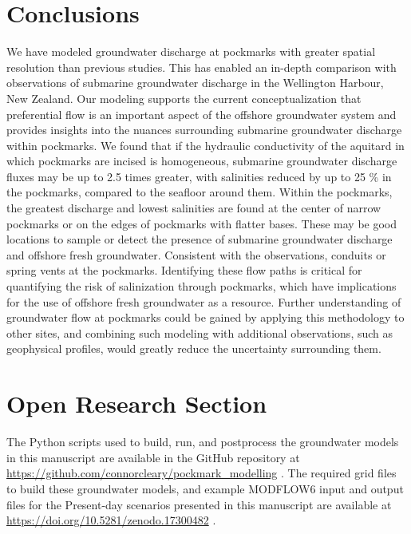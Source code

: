 \documentclass[draft, 10pt]{agujournal2019}
\begin{document}
\section{Conclusions}
We have modeled groundwater discharge at pockmarks with greater spatial resolution than previous studies.
This has enabled an in-depth comparison with observations of submarine groundwater discharge in the Wellington Harbour, New Zealand.
Our modeling supports the current conceptualization that preferential flow is an important aspect of the offshore groundwater system and provides insights into the nuances surrounding submarine groundwater discharge within pockmarks.
We found that if the hydraulic conductivity of the aquitard in which pockmarks are incised is homogeneous, submarine groundwater discharge fluxes may be up to 2.5 times greater,
with salinities reduced by up to 25 \% in the pockmarks,
compared to the seafloor around them.
Within the pockmarks, the greatest discharge and lowest salinities are found at the center of narrow pockmarks or on the edges of pockmarks with flatter bases.
These may be good locations to sample or detect the presence of submarine groundwater discharge and offshore fresh groundwater.
Consistent with the observations, conduits or spring vents at the pockmarks.
Identifying these flow paths is critical for quantifying the risk of salinization through pockmarks, which have implications for the use of offshore fresh groundwater as a resource.
Further understanding of groundwater flow at pockmarks could be gained by applying this methodology to other sites, and combining such modeling with additional observations, such as geophysical profiles, would greatly reduce the uncertainty surrounding them.

\section*{Open Research Section}
The Python scripts used to build, run, and postprocess the groundwater models in this manuscript are available in the GitHub repository at \url{https://github.com/connorcleary/pockmark_modelling} \cite{cleary_python_2025}. The required grid files to build these groundwater models, and example MODFLOW6 input and output files for the Present-day scenarios presented in this manuscript are available at \url{https://doi.org/10.5281/zenodo.17300482} \cite{cleary_grid_2025}.
\end{document}
